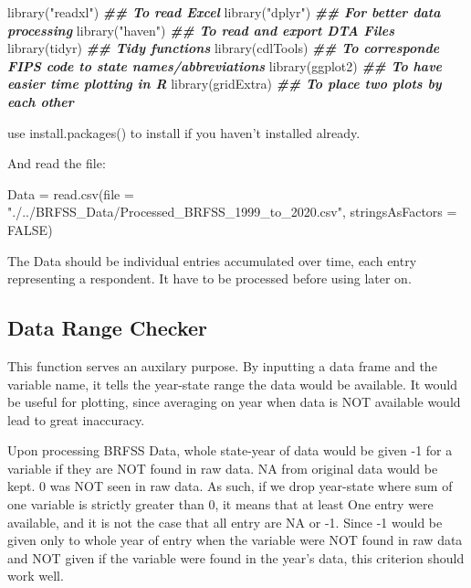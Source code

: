 \documentclass[
]{article}
\newenvironment{Shaded}{\begin{snugshade}}{\end{snugshade}}
\newcommand{\AttributeTok}[1]{\textcolor[rgb]{0.77,0.63,0.00}{#1}}
\newcommand{\ConstantTok}[1]{\textcolor[rgb]{0.00,0.00,0.00}{#1}}
\newcommand{\DocumentationTok}[1]{\textcolor[rgb]{0.56,0.35,0.01}{\textbf{\textit{#1}}}}
\newcommand{\FunctionTok}[1]{\textcolor[rgb]{0.00,0.00,0.00}{#1}}
\newcommand{\NormalTok}[1]{#1}
\newcommand{\OtherTok}[1]{\textcolor[rgb]{0.56,0.35,0.01}{#1}}
\newcommand{\StringTok}[1]{\textcolor[rgb]{0.31,0.60,0.02}{#1}}
\begin{document}
\begin{Shaded}
\begin{Highlighting}[]
\FunctionTok{library}\NormalTok{(}\StringTok{"readxl"}\NormalTok{) }\DocumentationTok{\#\# To read Excel}
\FunctionTok{library}\NormalTok{(}\StringTok{"dplyr"}\NormalTok{) }\DocumentationTok{\#\# For better data processing}
\FunctionTok{library}\NormalTok{(}\StringTok{"haven"}\NormalTok{) }\DocumentationTok{\#\# To read and export DTA Files}
\FunctionTok{library}\NormalTok{(tidyr) }\DocumentationTok{\#\# Tidy functions}
\FunctionTok{library}\NormalTok{(cdlTools) }\DocumentationTok{\#\# To corresponde FIPS code to state names/abbreviations}
\FunctionTok{library}\NormalTok{(ggplot2) }\DocumentationTok{\#\# To have easier time plotting in R}
\FunctionTok{library}\NormalTok{(gridExtra) }\DocumentationTok{\#\# To place two plots by each other}
\end{Highlighting}
\end{Shaded}

use install.packages() to install if you haven't installed already.

And read the file:

\begin{Shaded}
\begin{Highlighting}[]
\NormalTok{Data }\OtherTok{=} \FunctionTok{read.csv}\NormalTok{(}\AttributeTok{file =} \StringTok{"./../BRFSS\_Data/Processed\_BRFSS\_1999\_to\_2020.csv"}\NormalTok{, }
                \AttributeTok{stringsAsFactors =} \ConstantTok{FALSE}\NormalTok{)}
\end{Highlighting}
\end{Shaded}

The Data should be individual entries accumulated over time, each entry
representing a respondent. It have to be processed before using later
on.

\hypertarget{data-range-checker}{%
\subsection{Data Range Checker}\label{data-range-checker}}

This function serves an auxilary purpose. By inputting a data frame and
the variable name, it tells the year-state range the data would be
available. It would be useful for plotting, since averaging on year when
data is NOT available would lead to great inaccuracy.

Upon processing BRFSS Data, whole state-year of data would be given -1
for a variable if they are NOT found in raw data. NA from original data
would be kept. 0 was NOT seen in raw data. As such, if we drop
year-state where sum of one variable is strictly greater than 0, it
means that at least One entry were available, and it is not the case
that all entry are NA or -1. Since -1 would be given only to whole year
of entry when the variable were NOT found in raw data and NOT given if
the variable were found in the year's data, this criterion should work
well.
\end{document}
